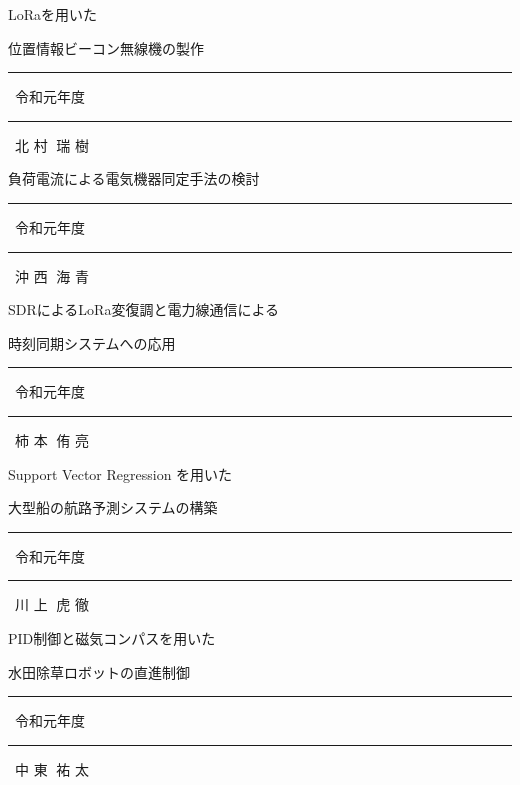 \documentclass {tarticle}
\begin{document}
\begin{minipage}{0.45\textwidth}{\huge%
LoRaを用いた

位置情報ビーコン無線機の製作
}
\end{minipage}{\Huge 
\vspace*{1cm}
\rule[-0.7cm]{0.5mm}{1.4cm}
 \ 令和元年度 \  %
\rule[-0.7cm]{0.5mm}{1.4cm}
 \ 北 村$\;$ 瑞 樹}


\vspace*{1cm}
\begin{minipage}{0.45\textwidth}{\huge%
負荷電流による電気機器同定手法の検討
}
\end{minipage}{\Huge 
\vspace*{1cm}
\rule[-0.7cm]{0.5mm}{1.4cm}
 \ 令和元年度 \  %
\rule[-0.7cm]{0.5mm}{1.4cm}
 \ 沖 西$\;$ 海 青}


\vspace*{1cm}
\begin{minipage}{0.45\textwidth}{\huge%
SDRによるLoRa変復調と電力線通信による

時刻同期システムへの応用
}
\end{minipage}{\Huge 
\vspace*{1cm}
\rule[-0.7cm]{0.5mm}{1.4cm}
 \ 令和元年度 \  %
\rule[-0.7cm]{0.5mm}{1.4cm}
 \ 柿 本$\;$ 侑 亮}


\vspace*{1cm}
\begin{minipage}{0.45\textwidth}{\huge%
Support Vector Regression を用いた

大型船の航路予測システムの構築
 
}
\end{minipage}{\Huge 
\vspace*{1cm}
\rule[-0.7cm]{0.5mm}{1.4cm}
 \ 令和元年度 \  %
\rule[-0.7cm]{0.5mm}{1.4cm}
 \ 川 上$\;$ 虎 徹}



\vspace*{1cm}
\begin{minipage}{0.45\textwidth}{\huge%
PID制御と磁気コンパスを用いた

水田除草ロボットの直進制御
 
}
\end{minipage}{\Huge 
\vspace*{1cm}
\rule[-0.7cm]{0.5mm}{1.4cm}
 \ 令和元年度 \  %
\rule[-0.7cm]{0.5mm}{1.4cm}
 \ 中 東$\;$ 祐 太}
\end{document}
